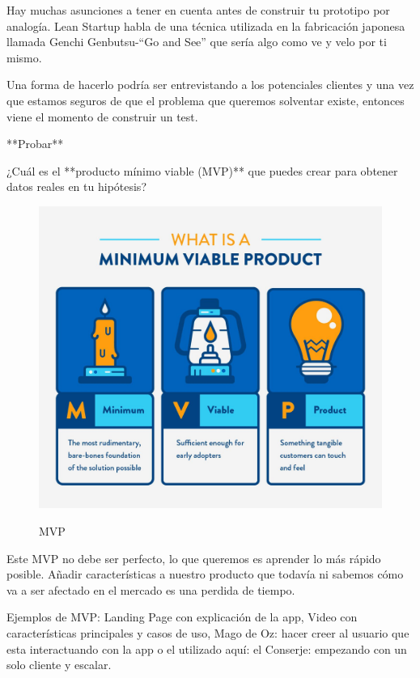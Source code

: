 \documentclass[12pt,twoside,titlepage]{report}
\begin{document}
Hay muchas asunciones a tener en cuenta antes de construir tu prototipo por analogía. Lean Startup habla de una técnica utilizada en la fabricación japonesa llamada Genchi Genbutsu-“Go and See” que sería algo como ve y velo por ti mismo. 

Una forma de hacerlo podría ser entrevistando a los potenciales clientes y una vez que estamos seguros de que el problema que queremos solventar existe, entonces viene el momento de construir un test.

**Probar**

¿Cuál es el **producto mínimo viable (MVP)** que puedes crear para obtener datos reales en tu hipótesis?

\begin{figure}[H]
    \centering
    \includegraphics[scale=0.1]{Lean Startup/MVP}
    \label{fig:MVP}
    \caption{MVP}
\end{figure}

Este MVP no debe ser perfecto, lo que queremos es aprender lo más rápido posible. Añadir características a nuestro producto que todavía ni sabemos cómo va a ser afectado en el mercado es una perdida de tiempo.

Ejemplos de MVP: Landing Page con explicación de la app, Video con características principales y casos de uso, Mago de Oz: hacer creer al usuario que esta interactuando con la app o el utilizado aquí: el Conserje: empezando con un solo cliente y escalar.
\end{document}
